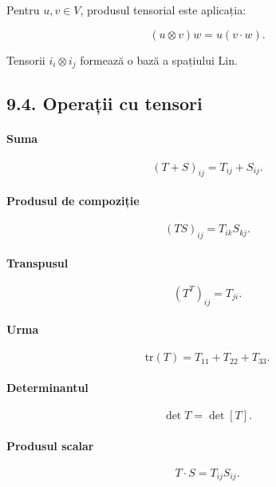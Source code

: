\documentclass[12pt,a4paper]{article}
\begin{document}
Pentru $u,v \in V$, produsul tensorial este aplicația:


\[
(u \otimes v) w = u (v \cdot w).
\]



Tensorii $i_i \otimes i_j$ formează o bază a spațiului $\mathrm{Lin}$.

\subsection{9.4. Operații cu tensori}

\paragraph{Suma}


\[
(T+S)_{ij} = T_{ij} + S_{ij}.
\]



\paragraph{Produsul de compoziție}


\[
(TS)_{ij} = T_{ik} S_{kj}.
\]



\paragraph{Transpusul}


\[
(T^T)_{ij} = T_{ji}.
\]



\paragraph{Urma}


\[
\mathrm{tr}(T) = T_{11} + T_{22} + T_{33}.
\]



\paragraph{Determinantul}


\[
\det T = \det [T].
\]



\paragraph{Produsul scalar}


\[
T \cdot S = T_{ij} S_{ij}.
\]
\end{document}
